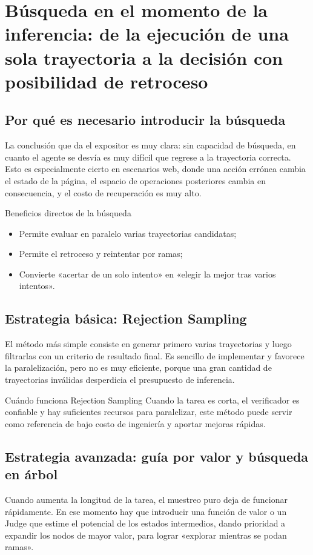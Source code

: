 \section{Búsqueda en el momento de la inferencia: de la ejecución de una sola trayectoria a la decisión con posibilidad de retroceso}

\subsection{Por qué es necesario introducir la búsqueda}
La conclusión que da el expositor es muy clara: sin capacidad de búsqueda, en cuanto el agente se desvía es muy difícil que regrese a la trayectoria correcta. Esto es especialmente cierto en escenarios web, donde una acción errónea cambia el estado de la página, el espacio de operaciones posteriores cambia en consecuencia, y el costo de recuperación es muy alto.

\begin{importantbox}{Beneficios directos de la búsqueda}
\begin{itemize}
    \item Permite evaluar en paralelo varias trayectorias candidatas;
    \item Permite el retroceso y reintentar por ramas;
    \item Convierte «acertar de un solo intento» en «elegir la mejor tras varios intentos».
\end{itemize}
\end{importantbox}

\subsection{Estrategia básica: Rejection Sampling}
El método más simple consiste en generar primero varias trayectorias y luego filtrarlas con un criterio de resultado final. Es sencillo de implementar y favorece la paralelización, pero no es muy eficiente, porque una gran cantidad de trayectorias inválidas desperdicia el presupuesto de inferencia.

\begin{knowledgebox}{Cuándo funciona Rejection Sampling}
Cuando la tarea es corta, el verificador es confiable y hay suficientes recursos para paralelizar, este método puede servir como referencia de bajo costo de ingeniería y aportar mejoras rápidas.
\end{knowledgebox}

\subsection{Estrategia avanzada: guía por valor y búsqueda en árbol}
Cuando aumenta la longitud de la tarea, el muestreo puro deja de funcionar rápidamente. En ese momento hay que introducir una función de valor o un Judge que estime el potencial de los estados intermedios, dando prioridad a expandir los nodos de mayor valor, para lograr «explorar mientras se podan ramas».

